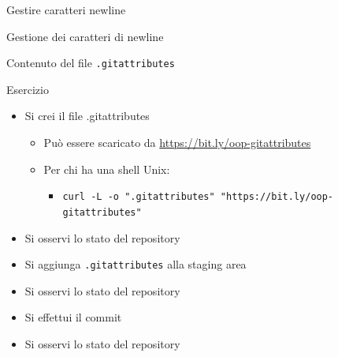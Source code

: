 \documentclass[xcolor=dvipsnames,presentation]{beamer}
\begin{document}
\begin{frame}{Gestire caratteri newline}
\begin{block}{Gestione dei caratteri di newline}
\begin{itemize}
\begin{itemize}
            \end{itemize}
        \end{itemize}
    \end{block}
    \begin{block}{Contenuto del file \texttt{.gitattributes}}
    \end{block}
    \begin{block}{Esercizio}
        \begin{itemize}
            \item Si crei il file .gitattributes
            \begin{itemize}
                \item Può essere scaricato da \url{https://bit.ly/oop-gitattributes}
                \item Per chi ha una shell Unix:
                \begin{itemize}
                    \item {\scriptsize \texttt{curl -L -o ".gitattributes" "https://bit.ly/oop-gitattributes"}}
                \end{itemize}
            \end{itemize}
            \item Si osservi lo stato del repository
            \item Si aggiunga \texttt{.gitattributes} alla staging area
            \item Si osservi lo stato del repository
            \item Si effettui il commit
            \item Si osservi lo stato del repository
        \end{itemize}
    \end{block}
\end{frame}
\end{document}
